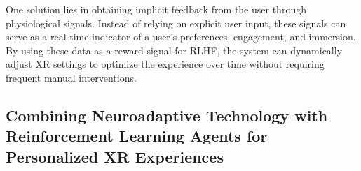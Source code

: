 One solution lies in obtaining implicit feedback from the user through physiological signals. Instead of relying on explicit user input, these signals can serve as a real-time indicator of a user's preferences, engagement, and immersion. By using these data as a reward signal for RLHF, the system can dynamically adjust XR settings to optimize the experience over time without requiring frequent manual interventions.

\subsection*{Combining Neuroadaptive Technology with Reinforcement Learning Agents for Personalized XR Experiences}




